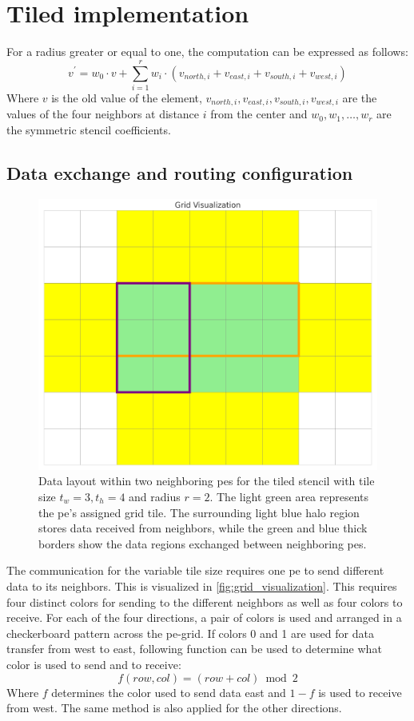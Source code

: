 \section{Tiled implementation}
For a radius greater or equal to one, the computation can be expressed as follows:
\begin{equation}
    \label{eq:stencil_computation_tiled}
    v^{'} = w_0 \cdot v + \sum_{i=1}^{r} w_i \cdot (v_{north,i} + v_{east,i} + v_{south,i} + v_{west,i})
\end{equation}
Where $v$ is the old value of the element, $v_{north,i}, v_{east,i}, v_{south,i}, v_{west,i}$ are the values of the four neighbors at distance $i$ from the center and $w_0, w_1, \dots, w_r$ are the symmetric stencil coefficients.

\subsection{Data exchange and routing configuration}
\begin{figure}
    \centering
    \includegraphics[width=0.5\linewidth]{grid_visualization.png}
    \caption{Data layout within two neighboring \acp{pe} for the tiled stencil with tile size $t_w=3, t_h=4$ and radius $r=2$. The light green area represents the \ac{pe}'s assigned grid tile. The surrounding light blue halo region stores data received from neighbors, while the green and blue thick borders show the data regions exchanged between neighboring \acp{pe}.}
    \label{fig:grid_visualization}
\end{figure}
The communication for the variable tile size requires one \ac{pe} to send different data to its neighbors. This is visualized in \autoref{fig:grid_visualization}. This requires four distinct colors for sending to the different neighbors as well as four colors to receive. For each of the four directions, a pair of colors is used and arranged in a checkerboard pattern across the \ac{pe}-grid.
If colors 0 and 1 are used for data transfer from west to east, following function can be used to determine what color is used to send and to receive:
\begin{equation}
    \label{eq:tiled_coloring_function}
    f(row, col)=(row+col) \bmod 2
\end{equation}
Where $f$ determines the color used to send data east and $1-f$ is used to receive from west. The same method is also applied for the other directions.

